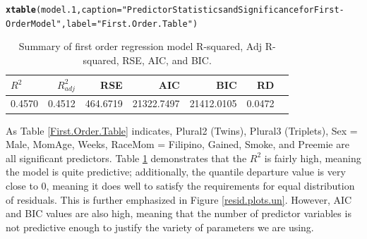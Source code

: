 \documentclass{article}\usepackage[]{graphicx}\usepackage[]{xcolor}
\makeatletter
\newcommand{\hlstr}[1]{\textcolor[rgb]{0.192,0.494,0.8}{#1}}%
\newcommand{\hlstd}[1]{\textcolor[rgb]{0.345,0.345,0.345}{#1}}%
\newcommand{\hlkwc}[1]{\textcolor[rgb]{0.333,0.667,0.333}{#1}}%
\newcommand{\hlkwd}[1]{\textcolor[rgb]{0.737,0.353,0.396}{\textbf{#1}}}%
\newenvironment{kframe}{%
 \def\at@end@of@kframe{}%
 \ifinner\ifhmode%
  \def\at@end@of@kframe{\end{minipage}}%
  \begin{minipage}{\columnwidth}%
 \fi\fi%
 \def\FrameCommand##1{\hskip\@totalleftmargin \hskip-\fboxsep
 \colorbox{shadecolor}{##1}\hskip-\fboxsep
     \hskip-\linewidth \hskip-\@totalleftmargin \hskip\columnwidth}%
 \MakeFramed {\advance\hsize-\width
   \@totalleftmargin\z@ \linewidth\hsize
   \@setminipage}}%
 {\par\unskip\endMakeFramed%
 \at@end@of@kframe}
\newenvironment{knitrout}{}{} %
\makeatother
\begin{document}
\begin{knitrout}
\color{fgcolor}\begin{kframe}
\begin{alltt}
\hlkwd{xtable}\hlstd{(model.1,} \hlkwc{caption}\hlstd{=}\hlstr{"Predictor Statistics and Significance for First-Order Model"}\hlstd{,} \hlkwc{label}\hlstd{=}\hlstr{"First.Order.Table"}\hlstd{)}
\end{alltt}
\end{kframe}
\end{knitrout}

\begin{table}[H]
\centering
\begin{tabular}{lrrrrrr}
  \hline
$R^2$ & $R^2_{adj}$ & RSE & AIC & BIC & RD\\ 
  \hline
   0.4570 & 0.4512 & 464.6719 & 21322.7497 & 21412.0105 & 0.0472 \\ 
   \hline
\end{tabular}
\caption{Summary of first order regression model R-squared, Adj R-squared, RSE, AIC, and BIC.}
\label{first.order.summary}
\end{table}

As Table \ref{First.Order.Table} indicates, Plural2 (Twins), Plural3 (Triplets), Sex = Male, MomAge, Weeks, RaceMom = Filipino, Gained, Smoke, and Preemie are all significant predictors. Table \ref{first.order.summary} demonstrates that the $R^2$ is fairly high, meaning the model is quite predictive; additionally, the quantile departure value is very close to 0, meaning it does well to satisfy the requirements for equal distribution of residuals. This is further emphasized in Figure \ref{resid.plots.un}. However, AIC and BIC values are also high, meaning that the number of predictor variables is not predictive enough to justify the variety of parameters we are using.
\end{document}
